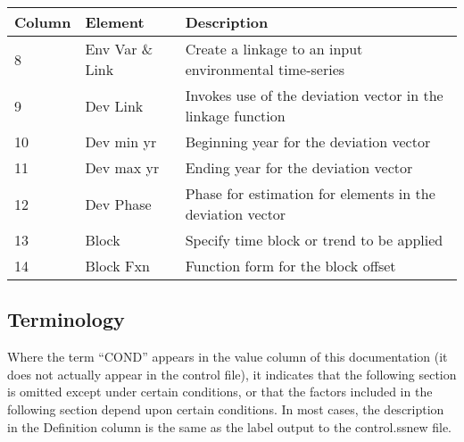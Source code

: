 \begin{center}
	\begin{tabular}{p{2cm} p{3cm} p{10cm}}
		\hline
		Column & Element & Description \Tstrut\Bstrut\\
		\hline
		8  & Env Var \& Link & Create a linkage to an input environmental time-series\Tstrut\Bstrut\\
		9  \Tstrut & Dev Link & Invokes use of the deviation vector in the linkage function \\
		10 \Tstrut & Dev min yr & Beginning year for the deviation vector \\
		11 \Tstrut & Dev max yr & Ending year for the deviation vector\\
		12 \Tstrut & Dev Phase & Phase for estimation for elements in the deviation vector \\
		13 \Tstrut & Block & Specify time block or trend to be applied \\
		14 \Bstrut & Block Fxn & Function form for the block offset\\
		\hline
	\end{tabular}
\end{center}

\subsection{Terminology}
Where the term “COND” appears in the value column of this documentation (it does not actually appear in the control file), it indicates that the following section is omitted except under certain conditions, or that the factors included in the following section depend upon certain conditions.
In most cases, the description in the Definition column is the same as the label output to the control.ss\textunderscore new file.

